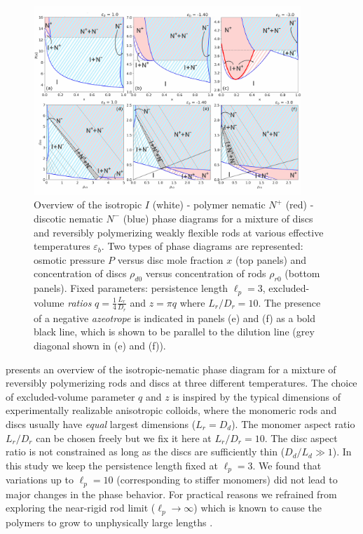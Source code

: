 \begin{figure}[ht]
  \includegraphics[width=0.9\textwidth]{figures/chapter-3/FIG3}
  \caption{Overview of the isotropic $I$ (white) -  polymer nematic $N^+$ (red) - discotic nematic $N^-$ (blue) phase diagrams for a mixture of discs and reversibly polymerizing weakly flexible rods at various effective temperatures $\varepsilon_{b}$. Two types of phase diagrams are represented: osmotic pressure $P$ versus disc mole fraction $x$ (top panels) and concentration of discs $\rho_{d0}$ versus concentration of rods $\rho_{r0}$ (bottom panels). Fixed parameters: persistence length $\ell_{p} = 3$, excluded-volume {\em ratios} $q = \frac{1}{4}\frac{L_{r}}{D_{r}}$ and $z=\pi q$ where $L_{r}/D_{r} =10$. The presence of a negative {\em azeotrope} is indicated in panels (e) and (f) as a bold black line, which is shown to be parallel to the dilution line (grey diagonal shown in (e) and (f)).}
  \label{fig:L10}
\end{figure}


 presents an overview of the isotropic-nematic phase diagram for a mixture of reversibly polymerizing rods and discs at three different temperatures.  The choice of excluded-volume parameter $q$ and $z$ is inspired by the typical dimensions of experimentally realizable anisotropic colloids, where the  monomeric rods and discs usually have {\em equal} largest dimensions ($L_{r} = D_{d}$). The monomer aspect ratio $L_{r}/D_{r}$ can be chosen freely but we fix it here at  $L_{r}/D_{r} = 10$. The disc aspect ratio is not constrained as long as the discs are sufficiently thin ($D_{d}/L_{d} \gg 1$). In this study we keep the persistence length fixed at $\ell_{p} =3$. We found that variations up to $\ell_{p} =10$ (corresponding to stiffer monomers) did not lead to major changes in the phase behavior.  For practical reasons we refrained from exploring the near-rigid rod limit ($\ell_{p} \rightarrow \infty$) which is known to cause the polymers to grow to unphysically large lengths \cite{vdschoot1994la}.

